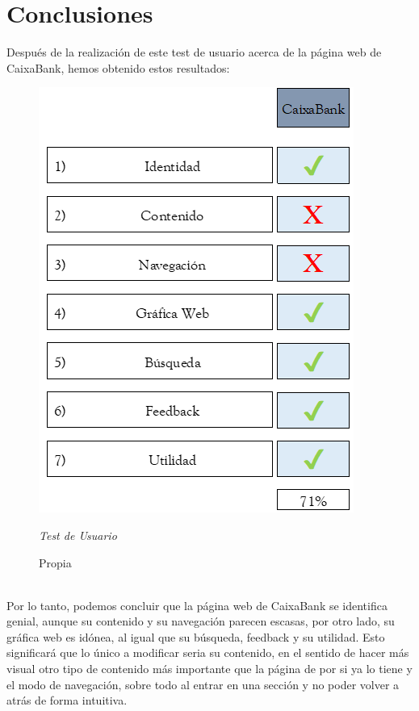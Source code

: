 \documentclass[openany,overnay,a4paper, twoside, 14pt]{book}
\begin{document}
\chapter*{Conclusiones}
Después de la realización de este test de usuario acerca de la página web de CaixaBank, hemos obtenido estos resultados:
\begin{figure}[h]
\centering

\includegraphics[scale = 0.7]{taba_resumen_caixa.png}
\renewcommand{\figurename}{Tabla resumen}
\renewcommand{\thefigure}{}
\caption{\textit{Test de Usuario}}
\renewcommand{\figurename}{Fuente}
\caption{Propia}
\end{figure}
\\
Por lo tanto, podemos concluir que la página web de CaixaBank se identifica genial, aunque su contenido y su navegación parecen escasas, por otro lado, su gráfica web es idónea, al igual que su búsqueda, feedback y su utilidad. Esto significará que lo único a modificar seria su contenido, en el sentido de hacer más visual otro tipo de contenido más importante que la página de por si ya lo tiene y el modo de navegación, sobre todo al entrar en una sección y no poder volver a atrás de forma intuitiva.
\end{document}
